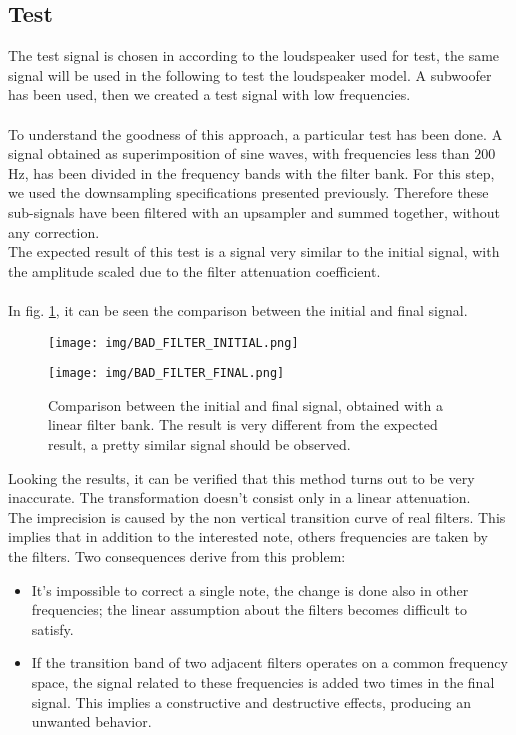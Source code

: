 \subsection{Test}
The test signal is chosen in according to the loudspeaker used for test, the same signal will be used in the following to test the loudspeaker model. A subwoofer has been used, then we created a test signal with low frequencies.\\\\
To understand the goodness of this approach, a particular test has been done. A signal obtained as superimposition of sine waves, with frequencies less than $200$Hz, has been divided in the frequency bands with the filter bank. For this step, we used the downsampling specifications presented previously. Therefore these sub-signals have been filtered with an upsampler and summed together, without any correction.\\
The expected result of this test is a signal very similar to the initial signal, with the amplitude scaled due to the filter attenuation coefficient.\\\\ 
In fig. \ref{fig:badFilterResult}, it can be seen the comparison between the initial and final signal.\\
\begin{figure}[h]
\centering
\begin{minipage}{\textwidth}
\texttt{[image: img/BAD\_FILTER\_INITIAL.png]} 
\end{minipage}
\hfill
\begin{minipage}{\textwidth}
\texttt{[image: img/BAD\_FILTER\_FINAL.png]} 
\end{minipage}
\caption{Comparison between the initial and final signal, obtained with a linear filter bank. The result is very different from the expected result, a pretty similar signal should be observed.}\label{fig:badFilterResult}
\end{figure}
Looking the results, it can be verified that this method turns out to be very inaccurate. The transformation doesn't consist only in a linear attenuation.\\
The imprecision is caused by the non vertical transition curve of real filters. This implies that in addition to the interested note, others frequencies are taken by the filters. Two consequences derive from this problem:
\begin{itemize}
\item It's impossible to correct a single note, the change is done also in other frequencies; the linear assumption about the filters becomes difficult to satisfy.
\item If the transition band of two adjacent filters operates on a common frequency space, the signal related to these frequencies is added two times in the final signal. This implies a constructive and destructive effects, producing an unwanted behavior.
\end{itemize}
